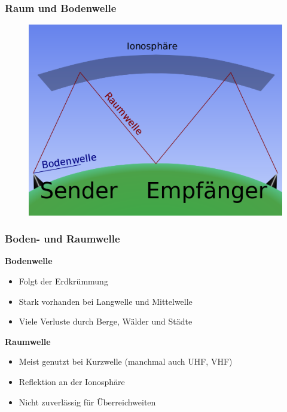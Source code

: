 \begin{frame}
  \frametitle{Raum und Bodenwelle}
    \begin{center}
      \begin{figure}
         \includegraphics[width=1\textwidth,height=.75\textheight,keepaspectratio]{e09/Ionospheric_reflectionpng.png}
       \end{figure}
    \end{center}
\end{frame}

\begin{frame}
    \frametitle{Boden- und Raumwelle}
    \textbf{Bodenwelle}
    \begin{itemize}
	    \item Folgt der Erdkrümmung
	    \item Stark vorhanden bei Langwelle und Mittelwelle
	    \item Viele Verluste durch Berge, Wälder und Städte
    \end{itemize}
    \textbf{Raumwelle}
    \begin{itemize}
	    \item Meist genutzt bei Kurzwelle (manchmal auch UHF, VHF)
	    \item Reflektion an der Ionosphäre 
	    \item Nicht zuverlässig für Überreichweiten
    \end{itemize}
\end{frame}

